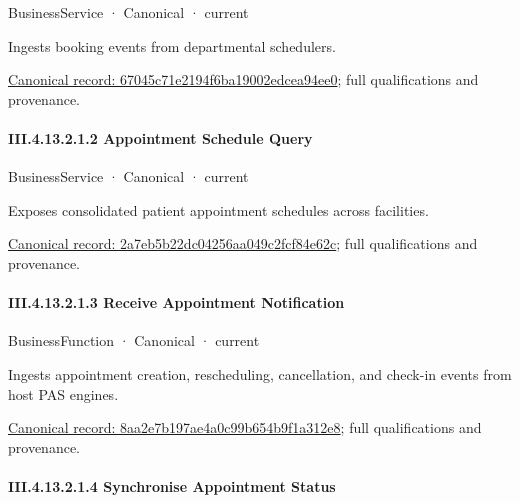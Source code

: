 \label{element:67045c71e2194f6ba19002edcea94ee0}
{\small BusinessService · Canonical · current}\par

Ingests booking events from departmental schedulers.


{\footnotesize \href{../../../../../../../../continuum/business/business-service/67045c71e2194f6ba19002edcea94ee0.md}{Canonical record: 67045c71e2194f6ba19002edcea94ee0}; full qualifications and provenance.}\par
\paragraph*{III.4.13.2.1.2 Appointment Schedule Query}
\label{navigation:III.4.13.2.1.2}

\label{element:2a7eb5b22dc04256aa049c2fcf84e62c}
{\small BusinessService · Canonical · current}\par

Exposes consolidated patient appointment schedules across facilities.


{\footnotesize \href{../../../../../../../../continuum/business/business-service/2a7eb5b22dc04256aa049c2fcf84e62c.md}{Canonical record: 2a7eb5b22dc04256aa049c2fcf84e62c}; full qualifications and provenance.}\par
\paragraph*{III.4.13.2.1.3 Receive Appointment Notification}
\label{navigation:III.4.13.2.1.3}

\label{element:8aa2e7b197ae4a0c99b654b9f1a312e8}
{\small BusinessFunction · Canonical · current}\par

Ingests appointment creation, rescheduling, cancellation, and check-in events from host PAS engines.


{\footnotesize \href{../../../../../../../../continuum/business/business-function/8aa2e7b197ae4a0c99b654b9f1a312e8.md}{Canonical record: 8aa2e7b197ae4a0c99b654b9f1a312e8}; full qualifications and provenance.}\par
\paragraph*{III.4.13.2.1.4 Synchronise Appointment Status}
\label{navigation:III.4.13.2.1.4}

